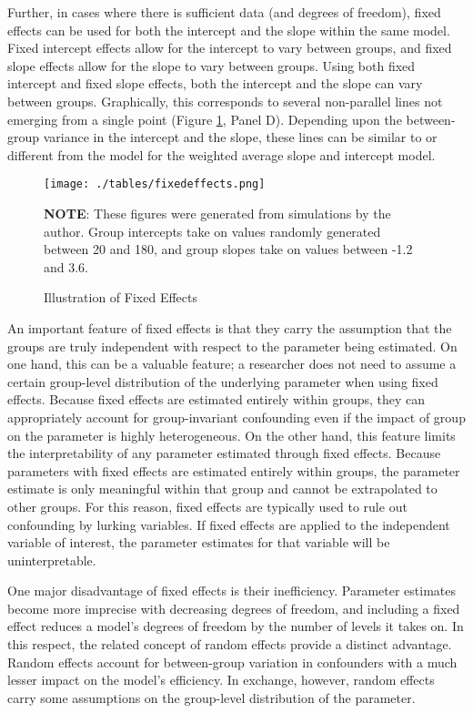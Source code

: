 \documentclass[12pt]{article}
\begin{document}
Further, in cases where there is sufficient data (and degrees of freedom), fixed effects can be used for both the intercept and the slope within the same model. Fixed intercept effects allow for the intercept to vary between groups, and fixed slope effects allow for the slope to vary between groups. Using both fixed intercept and fixed slope effects, both the intercept and the slope can vary between groups. Graphically, this corresponds to several non-parallel lines not emerging from a single point (Figure \ref{fig:FE}, Panel D). Depending upon the between-group variance in the intercept and the slope, these lines can be similar to or different from the model for the weighted average slope and intercept model.


\begin{figure}
    \centering
    \caption{Illustration of Fixed Effects}
    \texttt{[image: ./tables/fixedeffects.png]}
    \begin{minipage}{\textwidth}
    \footnotesize
    \textbf{NOTE}: These figures were generated from simulations by the author. Group intercepts take on values randomly generated between 20 and 180, and group slopes take on values between -1.2 and 3.6.
    \end{minipage}
    \label{fig:FE}
\end{figure}


An important feature of fixed effects is that they carry the assumption that the groups are truly independent with respect to the parameter being estimated. On one hand, this can be a valuable feature; a researcher does not need to assume a certain group-level distribution of the underlying parameter when using fixed effects. Because fixed effects are estimated entirely within groups, they can appropriately account for group-invariant confounding even if the impact of group on the parameter is highly heterogeneous. On the other hand, this feature limits the interpretability of any parameter estimated through fixed effects. Because parameters with fixed effects are estimated entirely within groups, the parameter estimate is only meaningful within that group and cannot be extrapolated to other groups. For this reason, fixed effects are typically used to rule out confounding by lurking variables. If fixed effects are applied to the independent variable of interest, the parameter estimates for that variable will be uninterpretable.

One major disadvantage of fixed effects is their inefficiency. Parameter estimates become more imprecise with decreasing degrees of freedom, and including a fixed effect reduces a model's degrees of freedom by the number of levels it takes on. In this respect, the related concept of random effects provide a distinct advantage. Random effects account for between-group variation in confounders with a much lesser impact on the model's efficiency. In exchange, however, random effects carry some assumptions on the group-level distribution of the parameter.
\end{document}
